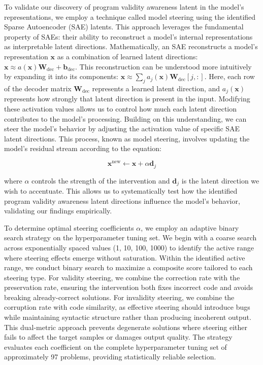 \documentclass[11pt]{article}
\begin{document}
To validate our discovery of program validity awareness latent in the model's representations, we employ a technique called model steering using the identified Sparse Autoencoder (SAE) latents. This approach leverages the fundamental property of SAEs: their ability to reconstruct a model's internal representations as interpretable latent directions. Mathematically, an SAE reconstructs a model's representation $\mathbf{x}$ as a combination of learned latent directions: $\mathbf{x} \approx a(\mathbf{x})\mathbf{W}_{\text{dec}} + \mathbf{b}_{\text{dec}}$.
This reconstruction can be understood more intuitively by expanding it into its components: $\mathbf{x} \approx \sum_j a_j(\mathbf{x})\mathbf{W}_{\text{dec}}[j,:]$. Here, each row of the decoder matrix $\mathbf{W}_{\text{dec}}$ represents a learned latent direction, and $a_j(\mathbf{x})$ represents how strongly that latent direction is present in the input. Modifying these activation values allows us to control how much each latent direction contributes to the model's processing.
Building on this understanding, we can steer the model's behavior by adjusting the activation value of specific SAE latent directions. This process, known as model steering, involves updating the model's residual stream according to the equation:

\begin{equation}
\mathbf{x}^{\text{new}} \leftarrow \mathbf{x} + \alpha\mathbf{d}_j
\end{equation}

where $\alpha$ controls the strength of the intervention and $\mathbf{d}_j$ is the latent direction we wish to accentuate. This allows us to systematically test how the identified program validity awareness latent directions influence the model's behavior, validating our findings empirically.

To determine optimal steering coefficients $\alpha$, we employ an adaptive binary search strategy on the hyperparameter tuning set. We begin with a coarse search across exponentially spaced values (1, 10, 100, 1000) to identify the active range where steering effects emerge without saturation. Within the identified active range, we conduct binary search to maximize a composite score tailored to each steering type. For validity steering, we combine the correction rate with the preservation rate, ensuring the intervention both fixes incorrect code and avoids breaking already-correct solutions. For invalidity steering, we combine the corruption rate with code similarity, as effective steering should introduce bugs while maintaining syntactic structure rather than producing incoherent output. This dual-metric approach prevents degenerate solutions where steering either fails to affect the target samples or damages output quality. The strategy evaluates each coefficient on the complete hyperparameter tuning set of approximately 97 problems, providing statistically reliable selection. 
\end{document}
